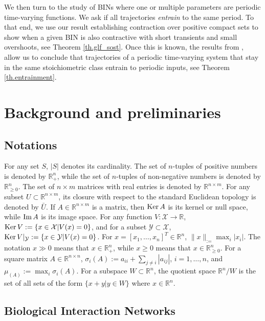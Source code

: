 \documentclass[onefignum,onetabnum]{siamonline220329}
\renewcommand{\Im}{{\mathop{\rm Im\,}}}
\renewcommand{\ker}{{\mathop{\rm Ker\,}}}
\newcommand{\imA}{\Im A}
\newcommand{\kerA}{\ker A}
\newcommand{\kerV}{\ker V}
\def\infty{}%
\begin{document}
We then turn to the study of BINs where one or multiple parameters are periodic time-varying functions. We ask if all trajectories \emph{entrain} to the same period. To that end, we use our result establishing contraction over positive compact sets to show when a given BIN is also contractive with short transients and small overshoots, see Theorem \ref{th.glf_sost}. 
Once this is known, the results from \cite{margaliot16}, allow us to conclude that trajectories of a periodic time-varying system that stay in the same stoichiometric class entrain to periodic inputs, see Theorem \ref{th.entrainment}.

\section{Background and preliminaries}

\subsection{Notations}
 
For any set $S$, $|S|$ denotes its cardinality. The set of $n$-tuples of positive numbers is denoted by $\mathbb R_+^n$, while the set of $n$-tuples of non-negative numbers is denoted by $\mathbb R_{\ge0}^n$. The set of $n\times m$ matrices with real entries is denoted by $\mathbb R^{n\times m}$. For any subset $U\subset \mathbb R^{n\times m}$, its closure with respect to the standard Euclidean topology is denoted by $\bar U$.  If $A\in\mathbb R^{n\times m}$ is a matrix, then $\kerA$ is its kernel or null space, while $\imA$ is its image space. For any function $V:\mathcal X \to \mathbb R$, $\kerV:=\{x\in\mathcal X| V(x)=0\}$, and for a subset $\mathcal Y \subset \mathcal X$, $\kerV|_{\mathcal Y}:=\{x\in\mathcal Y| V(x)=0\}$. 
For $x=[x_1,\dots,x_n]^T \in \mathbb R^n$, $\|x\|_\infty:=\max_i |x_i|$. The notation $x\gg0$ means that $x  \in\mathbb R_+^n$, {while $x\ge0$ means that $x\in\mathbb R_{\ge0}^n$}. For a square matrix $A\in\mathbb R^{n\times n}$, $\sigma_i(A):= a_{ii}+\sum_{j\ne i} |a_{ij}|$, $i=1,\dots,n$, and $\mu_\infty(A):=\max_i \sigma_i(A)$. For a subspace $W \subset \mathbb R^n$, the quotient space $\mathbb R^n/W $ is the set of all sets of the form $\{x+y|y\in W\}$ where $x \in \mathbb R^n$. %
 
\subsection{Biological Interaction Networks}
\label{sec:BIN}
 
\end{document}
